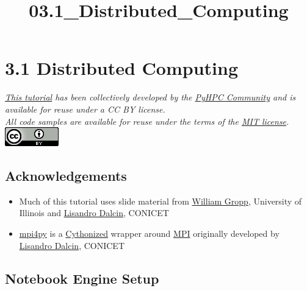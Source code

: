 \documentclass{article}
\title{03.1\_Distributed\_Computing}
\begin{document}
    
    
    \maketitle
    
    

    
    \section{3.1 Distributed Computing}\label{distributed-computing}

\emph{\href{https://github.com/pyHPC/pyhpc-tutorial}{This tutorial} has
been collectively developed by the \href{https://github.com/pyHPC}{PyHPC
Community} and is available for reuse under a CC BY license.\\All code
samples are available for reuse under the terms of the
\href{http://opensource.org/licenses/MIT}{MIT
license}.}\\\href{http://creativecommons.org/licenses/by/3.0/deed.en_US}{\includegraphics{../figures/creative_commons_logo.png}}

    \subsection{Acknowledgements}\label{acknowledgements}

\begin{itemize}
\itemsep1pt\parskip0pt
\item
  Much of this tutorial uses slide material from
  \href{http://www.cs.uiuc.edu/~wgropp/}{William Gropp}, University of
  Illinois and
  \href{http://plus.google.com/107621373684536061961/about}{Lisandro
  Dalcin}, CONICET
\item
  \href{http://code.google.com/p/mpi4py/}{mpi4py} is a
  \href{http://www.cython.org/}{Cythonized} wrapper around
  \href{http://www.mpi-forum.org/}{MPI} originally developed by
  \href{http://plus.google.com/107621373684536061961/about}{Lisandro
  Dalcin}, CONICET
\end{itemize}

    \subsection{Notebook Engine Setup}\label{notebook-engine-setup}
\end{document}
